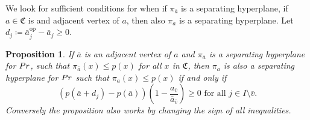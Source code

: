 \documentclass{article}
\newtheorem{proposition}[theorem]{Proposition}
\begin{document}
We look for sufficient conditions for when if \(\pi_{\bar{a}}\) is a separating hyperplane, if \(a \in \mathfrak{C}\) is and adjacent vertex of \(a\), then also \(\pi_a\) is a separating hyperplane.
Let \(d_j \coloneqq \bar{a}^{\text{op}}_j - \bar{a}_j \geq 0 \).

\begin{proposition}
	\label{prop: adjacent supporting hyperplanes}
	If \(\bar{a}\) is an adjacent vertex of \(a\) and \(\pi_{\bar{a}}\) is a separating hyperplane for \(Pr\), 
	such that \(\pi_{\bar{a}}(x) \leq p(x)\) for all \(x\) in \(\mathfrak{C}\), then \(\pi_a\) is also a separating hyperplane for \(Pr\) such that \(\pi_{a}(x) \leq p(x)\) if and only if 
	\begin{equation}
		\label{eq: supporting hyperplane}
		(p(\bar{a}+d_j) - p(\bar{a}))(1 - \frac{a_{\bar{v}}}{\bar{a}_{\bar{v}}}) \geq 0 \text{ for all } j \in I\setminus{\bar{v}}.
	\end{equation}
	Conversely the proposition also works by changing the sign of all inequalities.
\end{proposition}
\end{document}
